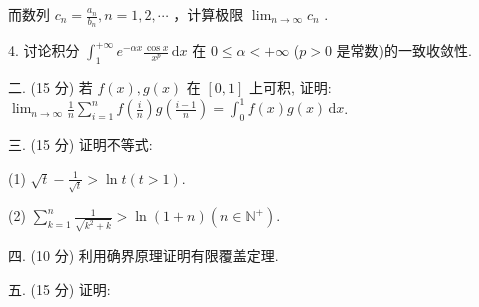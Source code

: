 \documentclass{examcollection}
\begin{document}
{\begin{minipage}{\textwidth}
而数列  $c_{n}=\frac{a_{n}}{b_{n}}, n=1,2,\cdots$ ，计算极限  $\lim_{n\to\infty}c_{n}$ .\par
4. 讨论积分 $\int_{1}^{+\infty} e^{-\alpha x} \frac{\cos x}{x^p} \, \mathrm{d}x$ 在 $0 \leq \alpha < +\infty$ ($p > 0$ 是常数)的一致收敛性.\par
二. (15 分) 若 $f(x), g(x)$ 在 $[0, 1]$ 上可积, 证明: $\lim_{n \to \infty} \frac{1}{n} \sum_{i=1}^{n} f\left(\frac{i}{n}\right) g\left(\frac{i-1}{n}\right) = \int_0^1 f(x) g(x) \, \mathrm{d}x$.\par
三. (15 分) 证明不等式:\par
(1) $\sqrt{t} - \frac{1}{\sqrt{t}} > \ln t (t > 1)$.\par
(2) $\sum_{k=1}^{n} \frac{1}{\sqrt{k^2 + k}} > \ln(1 + n) (n \in \mathbb{N}^+)$.\par
四. (10 分) 利用确界原理证明有限覆盖定理.\par
五. (15 分) 证明:\par
\end{minipage}}
\ifdim\dimexpr\ht\proofbox+\dp\proofbox\relax>\textheight
\noindent\resizebox{!}{\textheight}{\usebox{\proofbox}}\else\noindent\usebox{\proofbox}\fi\clearpage
\end{document}
